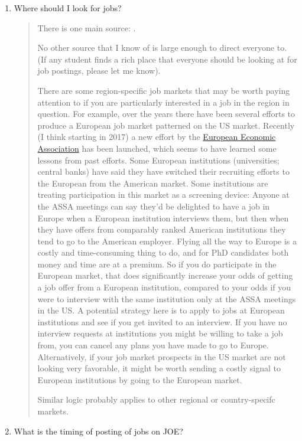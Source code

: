 \documentclass{\classes/econtex}
\begin{document}
\begin{enumerate}
\item  Where should I look for jobs? 

  \begin{quote}
    There is one main source: \JOE.

    No other source that I know of is large enough to direct everyone to. (If any student finds a rich place that everyone should be looking at for job postings, please let me know).

    \hypertarget{Region-Specific-Job-Markets}{}
    
    There are some region-specific job markets that may be worth paying attention to if you are particularly interested in a job in the region in question.  For example, over the years there have been several efforts to produce a European job market patterned on the US market.  Recently (I think starting in 2017) a new effort by the \href{https://www.eeassoc.org/}{European Economic Association} has been launched, which seems to have learned some lessons from past efforts. Some European institutions (universities; central banks) have said they have switched their recruiting efforts to the European from the American market.  Some institutions are treating participation in this market as a screening device: Anyone at the ASSA meetings can say they'd be delighted to have a job in Europe when a European institution interviews them, but then when they have offers from comparably ranked American institutions they tend to go to the American employer.  Flying all the way to Europe is a costly and time-consuming thing to do, and for PhD candidates both money and time are at a premium. So if you do participate in the European market, that does significantly increase your odds of getting a job offer from a European institution, compared to your odds if you were to interview with the same institution only at the ASSA meetings in the US. A potential strategy here is to apply to jobs at European institutions and see if you get invited to an interview.  If you have no interview requests at institutions you might be willing to take a job from, you can cancel any plans you have made to go to Europe.  Alternatively, if your job market prospects in the US market are not looking very favorable, it might be worth sending a costly signal to European institutions by going to the European market.

    Similar logic probably applies to other regional or country-specifc markets.
  \end{quote}
  
\item What is the timing of posting of jobs on JOE? 


\end{enumerate}
\end{document}

